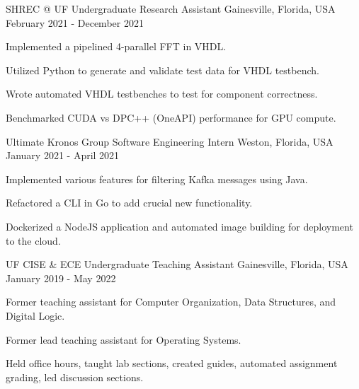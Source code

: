 \begin{cventries}

  \cventry
  {SHREC @ UF} %
  {Undergraduate Research Assistant} %
  {Gainesville, Florida, USA} %
  {February 2021 - December 2021} %
  {
    \begin{cvitems} %
      \item {Implemented a pipelined 4-parallel FFT in VHDL.}
      \item {Utilized Python to generate and validate test data for VHDL testbench.}
      \item {Wrote automated VHDL testbenches to test for component correctness.}
      \item {Benchmarked CUDA vs DPC++ (OneAPI) performance for GPU compute.}
    \end{cvitems}
  }


  \cventry
  {Ultimate Kronos Group} %
  {Software Engineering Intern} %
  {Weston, Florida, USA} %
  {January 2021 - April 2021} %
  {
    \begin{cvitems} %
      \item {Implemented various features for filtering Kafka messages using Java.}
      \item {Refactored a CLI in Go to add crucial new functionality.}
      \item {Dockerized a NodeJS application and automated image building for deployment to the cloud.}
    \end{cvitems}
  }


  \cventry
  {UF CISE \& ECE} %
  {Undergraduate Teaching Assistant} %
  {Gainesville, Florida, USA} %
  {January 2019 - May 2022} %
  {
    \begin{cvitems} %
      \item {Former teaching assistant for Computer Organization, Data Structures, and Digital Logic.}
      \item {Former lead teaching assistant for Operating Systems.}
      \item {Held office hours, taught lab sections, created guides, automated assignment grading, led discussion sections.}
    \end{cvitems}
  }


\end{cventries}
